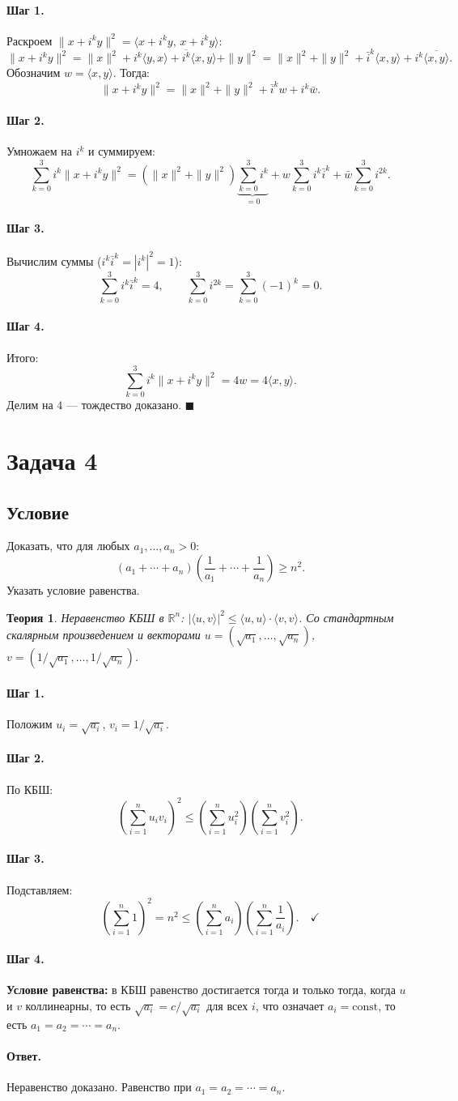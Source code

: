 \documentclass[12pt,a4paper]{article}
\theoremstyle{solution}
\newtheorem*{theory}{Теория}
\newcommand{\task}[1]{\newpage\section*{Задача #1}}
\newcommand{\answer}{\paragraph{Ответ.}}
\newcommand{\step}[1]{\paragraph{Шаг #1.}}
\newcommand{\R}{\mathbb{R}}
\begin{document}
\step{1} Раскроем $\|x+i^k y\|^2 = \langle x+i^k y,\, x+i^k y\rangle$:
\[
\|x+i^k y\|^2 = \|x\|^2 + i^k\langle y,x\rangle + \overline{i^k}\langle x,y\rangle + \|y\|^2
= \|x\|^2+\|y\|^2 + \bar{i}^k\langle x,y\rangle + i^k\overline{\langle x,y\rangle}.
\]
Обозначим $w=\langle x,y\rangle$. Тогда:
\[
\|x+i^k y\|^2 = \|x\|^2+\|y\|^2 + \bar{i}^k w + i^k\bar w.
\]

\step{2} Умножаем на $i^k$ и суммируем:
\[
\sum_{k=0}^{3}i^k\|x+i^k y\|^2
=(\|x\|^2+\|y\|^2)\underbrace{\sum_{k=0}^3 i^k}_{=0}
+w\sum_{k=0}^3 i^k\bar{i}^k + \bar w\sum_{k=0}^3 i^{2k}.
\]

\step{3} Вычислим суммы ($i^k\bar i^k=|i^k|^2=1$):
\[
\sum_{k=0}^3 i^k\bar i^k = 4,\qquad
\sum_{k=0}^3 i^{2k}=\sum_{k=0}^3(-1)^k=0.
\]

\step{4} Итого:
\[
\sum_{k=0}^3 i^k\|x+i^k y\|^2 = 4w = 4\langle x,y\rangle.
\]
Делим на $4$ --- тождество доказано. $\blacksquare$

\task{4}
\subsection*{Условие}
Доказать, что для любых $a_1,\ldots,a_n>0$:
\[
(a_1+\cdots+a_n)\!\left(\frac{1}{a_1}+\cdots+\frac{1}{a_n}\right)\geq n^2.
\]
Указать условие равенства.

\begin{theory}
Неравенство КБШ в $\R^n$: $|\langle u,v\rangle|^2\leq\langle u,u\rangle\cdot\langle v,v\rangle$. Со стандартным скалярным произведением и векторами $u=(\sqrt{a_1},\ldots,\sqrt{a_n})$, $v=(1/\sqrt{a_1},\ldots,1/\sqrt{a_n})$.
\end{theory}

\step{1} Положим $u_i=\sqrt{a_i}$, $v_i=1/\sqrt{a_i}$.

\step{2} По КБШ:
\[
\left(\sum_{i=1}^n u_iv_i\right)^2\leq\left(\sum_{i=1}^n u_i^2\right)\!\left(\sum_{i=1}^n v_i^2\right).
\]

\step{3} Подставляем:
\[
\left(\sum_{i=1}^n 1\right)^2 = n^2\leq \left(\sum_{i=1}^n a_i\right)\!\left(\sum_{i=1}^n\frac{1}{a_i}\right).\quad\checkmark
\]

\step{4} \textbf{Условие равенства:} в КБШ равенство достигается тогда и только тогда, когда $u$ и $v$ коллинеарны, то есть $\sqrt{a_i}=c/\sqrt{a_i}$ для всех $i$, что означает $a_i=\mathrm{const}$, то есть $a_1=a_2=\cdots=a_n$.

\answer Неравенство доказано. Равенство при $a_1=a_2=\cdots=a_n$.
\end{document}
